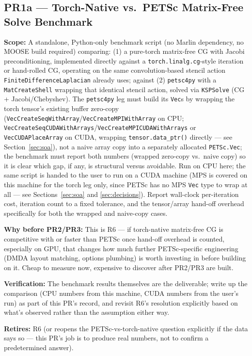 \documentclass[11pt]{article}
\newcommand{\pr}[2]{\subsection{PR#1 --- #2}}
\begin{document}
\pr{1a}{Torch-Native vs.\ PETSc Matrix-Free Solve Benchmark}
\textbf{Scope:} A standalone, Python-only benchmark script (no Marlin
dependency, no MOOSE build required) comparing: (1) a pure-torch matrix-free
CG with Jacobi preconditioning, implemented directly against a
\texttt{torch.linalg.cg}-style iteration or hand-rolled CG, operating on the
same convolution-based stencil action \texttt{FiniteDifferenceLaplacian}
already uses; against (2) \texttt{petsc4py} with a \texttt{MatCreateShell}
wrapping that identical stencil action, solved via \texttt{KSPSolve} (CG +
Jacobi/Chebyshev). The \texttt{petsc4py} leg must build its \texttt{Vec}s by
wrapping the torch tensor's existing buffer zero-copy
(\texttt{VecCreateSeqWithArray}/\texttt{VecCreateMPIWithArray} on CPU;
\texttt{VecCreateSeqCUDAWithArrays}/\texttt{VecCreateMPICUDAWithArrays} or
\texttt{VecCUDAPlaceArray} on CUDA, wrapping \texttt{tensor.data\_ptr()}
directly --- see Section~\ref{sec:soa}), not a naive array copy into a
separately allocated \texttt{PETSc.Vec}; the benchmark must report both
numbers (wrapped zero-copy vs.\ naive copy) so it is clear which gap, if
any, is structural versus avoidable. Run on CPU here; the same script is
handed to the user to run on a CUDA machine (MPS is covered on this machine
for the torch leg only, since PETSc has no MPS \texttt{Vec} type to wrap at
all --- see Sections~\ref{sec:soa} and \ref{sec:decisions}). Report
wall-clock per-iteration cost, iteration count to a fixed tolerance, and the
tensor/array hand-off overhead specifically for both the wrapped and
naive-copy cases.

\textbf{Why before PR2/PR3:} This is R6 --- if torch-native matrix-free CG
is competitive with or faster than PETSc once hand-off overhead is counted,
especially on GPU, that changes how much further PETSc-specific engineering
(DMDA layout matching, options plumbing) is worth investing in before
building on it. Cheap to measure now, expensive to discover after PR2/PR3
are built.

\textbf{Verification:} The benchmark results themselves are the
deliverable; write up the comparison (CPU numbers from this machine, CUDA
numbers from the user's run) as part of this PR's record, and revisit R6's
resolution explicitly based on what's observed rather than the assumption
either way.

\textbf{Retires:} R6 (or reopens the PETSc-vs-torch-native question
explicitly if the data says so --- this PR's job is to produce real
numbers, not to confirm a predetermined answer).
\end{document}
